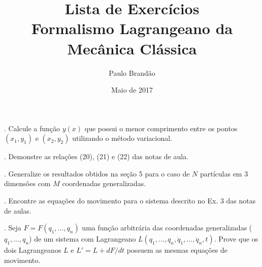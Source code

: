 \documentclass{article}
\title{\color{astral}\textbf{Lista de Exercícios} \\ \textbf{Formalismo Lagrangeano da Mecânica Clássica}}
\author{Paulo Brandão}
\date{Maio de 2017}
\begin{document}
\maketitle

. Calcule a função $y(x)$ que possui o menor comprimento entre os pontos $(x_1,y_1)$ e $(x_2,y_2)$ utilizando o método variacional.

\vspace{1cm}

. Demonstre as relações (20), (21) e (22) das notas de aula.

\vspace{1cm}

. Generalize os resultados obtidos na seção 5 para o caso de $N$ partículas em 3 dimensões com $M$ coordenadas generalizadas.

\vspace{1cm}

. Encontre as equações do movimento para o sistema descrito no Ex. 3 das notas de aulas.

\vspace{1cm}

. Seja $F = F(q_1,...,q_n)$ uma função arbitrária das coordenadas generalizadas ($q_1,...,q_n$) de um sistema com Lagrangeano $L(q_1,...,q_n,\dot{q}_1,...,\dot{q}_n,t)$. Prove que os dois Lagrangeanos $L$ e $L' = L + dF/dt$ possuem as mesmas equações de movimento.
\end{document}
